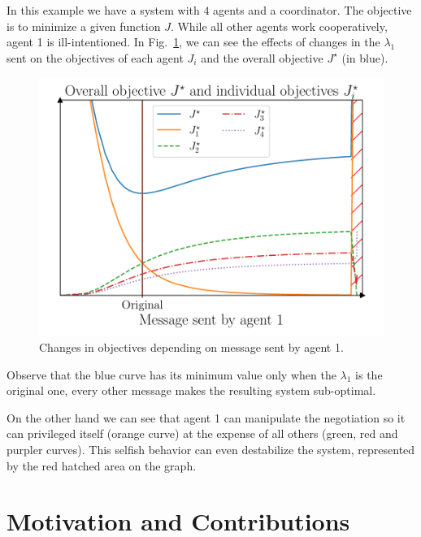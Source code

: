 \documentclass[../main.tex]{subfiles}
\begin{document}
\begin{example}
In this example we have a system with $4$ agents and a coordinator. The objective is to minimize a given function $J$. While all other agents work cooperatively, agent 1 is ill-intentioned. In Fig.~\ref{fig:change_in_j}, we can see the effects of changes in the $\lambda_{1}$ sent on the objectives of each agent $J_{i}$ and the overall objective $J^{\star}$ (in blue).
  \begin{figure}[H]
    \centering
    \includegraphics[width=.5\textwidth]{../img/qualitative_example.pdf}
    \caption{Changes in objectives depending on message sent by agent 1.}\label{fig:change_in_j}
  \end{figure}
  Observe that the blue curve has its minimum value only when the $\lambda_{1}$ is the original one, every other message makes the resulting system sub-optimal.

  On the other hand we can see that agent 1 can manipulate the negotiation so it can privileged itself (orange curve) at the expense of all others (green, red and purpler curves). This selfish behavior can even destabilize the system, represented by the red hatched area on the graph.
\end{example}

\section{Motivation and Contributions}

\end{document}
